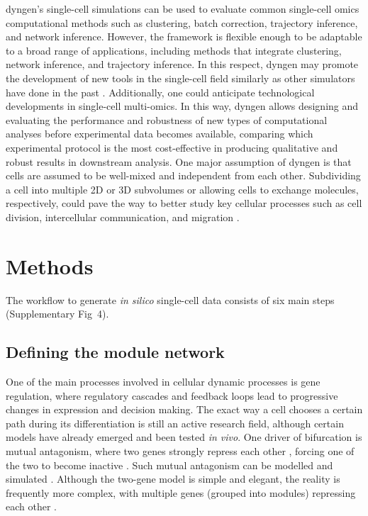 \documentclass[10pt, a4paper]{article}
\begin{document}
dyngen's single-cell simulations can be used to evaluate common
single-cell omics computational methods such as clustering, batch
correction, trajectory inference, and network inference. However, the
framework is flexible enough to be adaptable to a broad range of
applications, including methods that integrate clustering, network
inference, and trajectory inference. In this respect, dyngen may promote
the development of new tools in the single-cell field similarly as other
simulators have done in the past
\cite{schaffter_genenetweaversilicobenchmark_2011,ewing_combiningtumorgenome_2015}.
Additionally, one could anticipate technological developments in
single-cell multi-omics. In this way, dyngen allows designing and
evaluating the performance and robustness of new types of computational
analyses before experimental data becomes available, comparing which
experimental protocol is the most cost-effective in producing
qualitative and robust results in downstream analysis. One major
assumption of dyngen is that cells are assumed to be well-mixed and
independent from each other. Subdividing a cell into multiple 2D or 3D
subvolumes or allowing cells to exchange molecules, respectively, could
pave the way to better study key cellular processes such as cell
division, intercellular communication, and migration
\cite{smith_spatialstochasticintracellular_2019}.

\newpage

\section{Methods}\label{sec:dyngen-methods}

The workflow to generate \emph{in silico} single-cell data consists of
six main steps (Supplementary Fig~4).

\subsection{Defining the module network}\label{sec:dyngen-modules}

One of the main processes involved in cellular dynamic processes is gene
regulation, where regulatory cascades and feedback loops lead to
progressive changes in expression and decision making. The exact way a
cell chooses a certain path during its differentiation is still an
active research field, although certain models have already emerged and
been tested \emph{in vivo}. One driver of bifurcation is mutual
antagonism, where two genes strongly repress each other
\cite{rekhtman_directinteractionhematopoietic_1999,xu_regulationbifurcatingcell_2015},
forcing one of the two to become inactive
\cite{graf_forcingcellschange_2009}. Such mutual antagonism can be
modelled and simulated
\cite{wang_quantifyingwaddingtonlandscape_2011,ferrell_bistabilitybifurcationswaddington_2012}.
Although the two-gene model is simple and elegant, the reality is
frequently more complex, with multiple genes (grouped into modules)
repressing each other \cite{yosef_dynamicregulatorynetwork_2013}.
\end{document}
